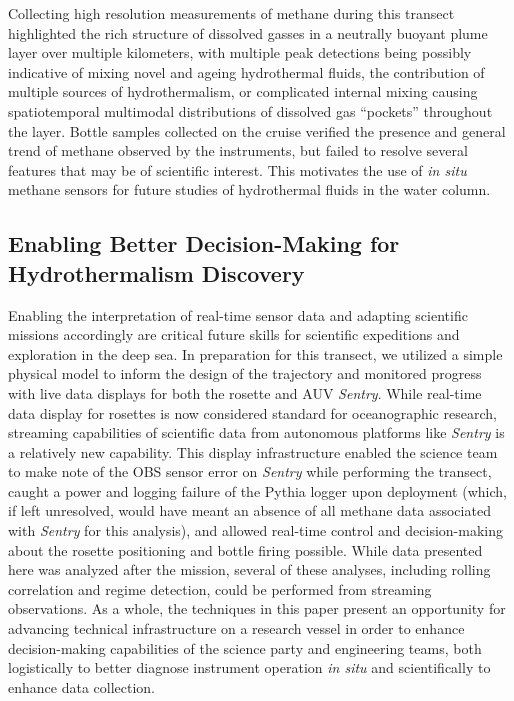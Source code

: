 Collecting high resolution measurements of methane during this transect highlighted the rich structure of dissolved gasses in a neutrally buoyant plume layer over multiple kilometers, with multiple peak detections being possibly indicative of mixing novel and ageing hydrothermal fluids, the contribution of multiple sources of hydrothermalism, or complicated internal mixing causing spatiotemporal multimodal distributions of dissolved gas ``pockets'' throughout the layer. Bottle samples collected on the cruise verified the presence and general trend of methane observed by the instruments, but failed to resolve several features that may be of scientific interest. This motivates the use of \emph{in situ} methane sensors for future studies of hydrothermal fluids in the water column. 


\subsection{Enabling Better Decision-Making for Hydrothermalism Discovery}
Enabling the interpretation of real-time sensor data and adapting scientific missions accordingly are critical future skills for scientific expeditions and exploration in the deep sea. In preparation for this transect, we utilized a simple physical model to inform the design of the trajectory and monitored progress with live data displays for both the rosette and AUV \emph{Sentry}. While real-time data display for rosettes is now considered standard for oceanographic research, streaming capabilities of scientific data from autonomous platforms like \emph{Sentry} is a relatively new capability. This display infrastructure enabled the science team to make note of the OBS sensor error on \emph{Sentry} while performing the transect, caught a power and logging failure of the Pythia logger upon deployment (which, if left unresolved, would have meant an absence of all methane data associated with \emph{Sentry} for this analysis), and allowed real-time control and decision-making about the rosette positioning and bottle firing possible. While data presented here was analyzed after the mission, several of these analyses, including rolling correlation and regime detection, could be performed from streaming observations. As a whole, the techniques in this paper present an opportunity for advancing technical infrastructure on a research vessel in order to enhance decision-making capabilities of the science party and engineering teams, both logistically to better diagnose instrument operation \emph{in situ} and scientifically to enhance data collection.

